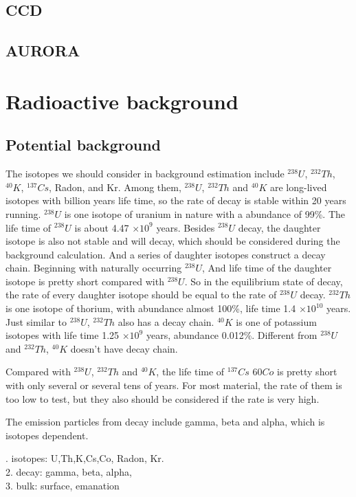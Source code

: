 \documentclass[review,number,sort&compress]{elsarticle}
\begin{document}
\subsection{CCD}

\subsection{AURORA}

\section{Radioactive background}
\subsection{Potential background}

The isotopes we should consider in background estimation include 
$^{238}U$, $^{232}Th$, $^{40}K$, $^{137}Cs$, Radon, and Kr.
Among them, $^{238}U$, $^{232}Th$ and $^{40}K$ are long-lived isotopes with billion years life time,
so the rate of decay is stable within 20 years running.
$^{238}U$ is one isotope of uranium in nature with a abundance of 99\%.
The life time of $^{238}U$ is about 4.47 $\times10^{9}$ years.
Besides $^{238}U$ decay, the daughter isotope is also not stable and will decay, 
which should be considered during the background calculation.
And a series of daughter isotopes construct a decay chain.
Beginning with naturally occurring $^{238}U$, 
And life time of the daughter isotope is pretty short compared with $^{238}U$.
So in the equilibrium state of decay, the rate of every daughter isotope should be equal to the rate of $^{238}U$ decay.
$^{232}Th$ is one isotope of thorium, with abundance almost 100\%, life time 1.4 $\times10^{10}$ years.
Just similar to $^{238}U$, $^{232}Th$ also has a decay chain.
$^{40}K$ is one of potassium isotopes with life time 1.25 $\times10^{9}$ years, abundance 0.012\%.
Different from $^{238}U$ and $^{232}Th$, $^{40}K$ doesn't have decay chain. 

Compared with $^{238}U$, $^{232}Th$ and $^{40}K$, 
the life time of $^{137}Cs$ ${60}Co$ is pretty short with only several or several tens of years. 
For most material, the rate of them is too low to test, but they also should be considered if the rate is very high.


The emission particles from decay include gamma, beta and alpha, which is isotopes dependent.

. isotopes: U,Th,K,Cs,Co, Radon, Kr. \\
2. decay: gamma, beta, alpha,\\
3. bulk: surface, emanation\\
\end{document}
